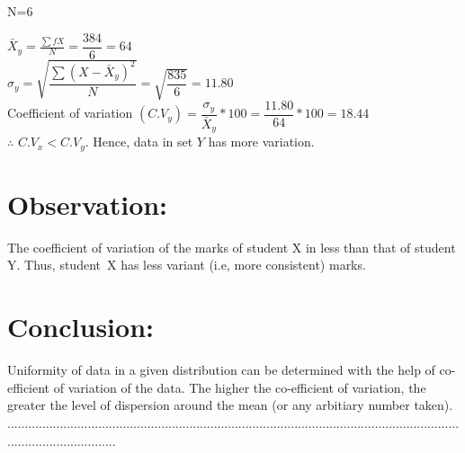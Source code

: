 \documentclass[11pt]{article}
\begin{document}
N=6


$\bar{X}_y=\displaystyle\frac{\sum fX}{N}=\dfrac{384}{6}=64$\\[5pt]


$\sigma_y= \sqrt{\dfrac{\sum (X-\bar{X}_y)^2}{N}}
= \sqrt{\dfrac{835}{6}}=11.80 $\\[5pt]

Coefficient of variation $(C.V_y)=\dfrac{\sigma_y}{\bar{X}_y}*100 = \dfrac{11.80}{64}*100 = 18.44$\\[1cm]


$\therefore$ $C.V_x<C.V_y.$\hspace{.2cm} Hence,   data in set $Y$ has more variation.


































    

\section{Observation:}
The coefficient of variation of the marks of student X in less than that of student Y. Thus, \mbox{student X} has less variant (i.e, more consistent) marks.
    
\section{Conclusion:}
Uniformity of data in a given distribution can be determined with the help of co-efficient of \mbox{variation} of the data. The higher the co-efficient of variation, the greater the level of dispersion around the mean (or any arbitiary number taken).\\[4.3cm]
\hspace{-1cm}
................................................................................................................................................................




\end{document}
